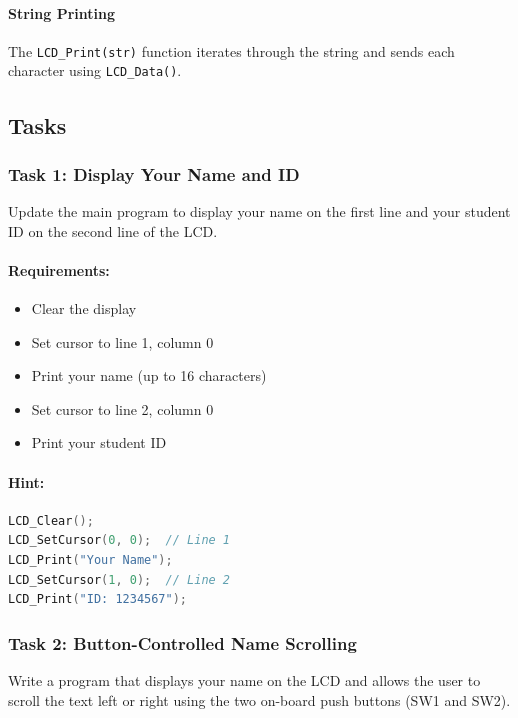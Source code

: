 \paragraph{String Printing}
The \texttt{LCD\_Print(str)} function iterates through the string and sends each character using \texttt{LCD\_Data()}.

\newpage
\subsection{Tasks}

\subsubsection{Task 1: Display Your Name and ID}

Update the main program to display your name on the first line and your student ID on the second line of the LCD.

\paragraph{Requirements:}
\begin{itemize}[nosep]
  \item Clear the display
  \item Set cursor to line 1, column 0
  \item Print your name (up to 16 characters)
  \item Set cursor to line 2, column 0
  \item Print your student ID
\end{itemize}

\paragraph{Hint:}
\begin{lstlisting}[language=C]
LCD_Clear();
LCD_SetCursor(0, 0);  // Line 1
LCD_Print("Your Name");
LCD_SetCursor(1, 0);  // Line 2
LCD_Print("ID: 1234567");
\end{lstlisting}

\subsubsection{Task 2: Button-Controlled Name Scrolling}

Write a program that displays your name on the LCD and allows the user to scroll the text left or right using the two on-board push buttons (SW1 and SW2).

